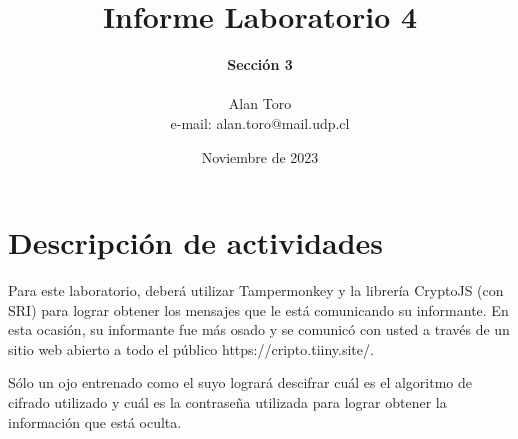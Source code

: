 \documentclass[letter,12pt]{article}
\begin{document}
   \title{\Huge{Informe Laboratorio 4}}
   \author{\textbf{Sección 3} \\  \\Alan Toro \\ e-mail: alan.toro@mail.udp.cl}
   \date{Noviembre de 2023}
   \maketitle
   \tableofcontents
  \newpage

\section{Descripción de actividades}
Para este laboratorio, deberá utilizar Tampermonkey y la librería CryptoJS (con
SRI) para lograr obtener los mensajes que le está comunicando su informante. En
esta ocasión, su informante fue más osado y se comunicó con usted a través de un
sitio web abierto a todo el público https://cripto.tiiny.site/.\par Sólo un ojo
entrenado como el suyo logrará descifrar cuál es el algoritmo de cifrado
utilizado y cuál es la contraseña utilizada para lograr obtener la información
que está oculta.
\end{document}
